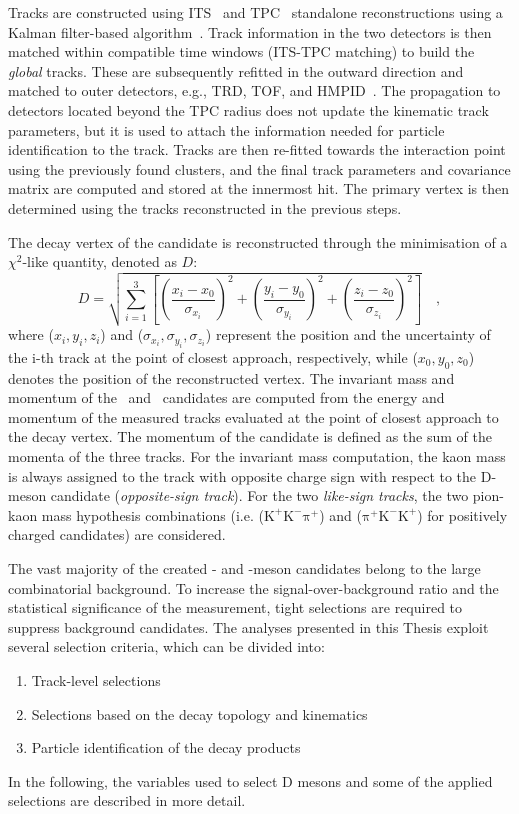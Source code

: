 Tracks are constructed using ITS~\cite{Concas:2878385} and TPC~\cite{Rohr:2018cxc} standalone reconstructions using a Kalman filter-based algorithm~\cite{Fruhwirth:1987fm}. Track information in the two detectors is then matched within compatible time windows (ITS-TPC matching) to build the \emph{global} tracks. These are subsequently refitted in the outward direction and matched to outer detectors, e.g., TRD, TOF, and HMPID~\cite{Rohr:2019ava}. The propagation to detectors located beyond the TPC radius does not update the kinematic track parameters, but it is used to attach the information needed for particle identification to the track. Tracks are then re-fitted towards the interaction point using the previously found clusters, and the final track parameters and covariance matrix are computed and stored at the innermost hit. The primary vertex is then determined using the tracks reconstructed in the previous steps.

The decay vertex of the candidate is reconstructed through the minimisation of a $\chi^2$-like quantity, denoted as $D$:
\begin{equation*}
    D = \sqrt{\sum_{i=1}^3 \left[\left(\frac{x_i-x_0}{\sigma_{x_i}}\right)^2 + \left(\frac{y_i-y_0}{\sigma_{y_i}}\right)^2 +\left(\frac{z_i-z_0}{\sigma_{z_i}}\right)^2\right]}\quad ,
\end{equation*}
where ($x_i,y_i,z_i$) and ($\sigma_{x_i},\sigma_{y_i},\sigma_{z_i}$) represent the position and the uncertainty of the i-th track at the point of closest approach, respectively, while ($x_0,y_0,z_0$) denotes the position of the reconstructed vertex. The invariant mass and momentum of the \ds\ and \dpl\ candidates are computed from the energy and momentum of the measured tracks evaluated at the point of closest approach to the decay vertex. The momentum of the candidate is defined as the sum of the momenta of the three tracks. For the invariant mass computation, the kaon mass is always assigned to the track with opposite charge sign with respect to the D-meson candidate (\emph{opposite-sign track}). For the two \emph{like-sign tracks}, the two pion-kaon mass hypothesis combinations \big(i.e. ($\mathrm{K^+K^-\pi^+}$) and ($\mathrm{\pi^+K^-K^+}$) for positively charged candidates\big) are considered. 

The vast majority of the created \ds- and \dpl-meson candidates belong to the large combinatorial background. To increase the signal-over-background ratio and the statistical significance of the measurement, tight selections are required to suppress background candidates. The analyses presented in this Thesis exploit several selection criteria, which can be divided into:
\begin{enumerate}[i]
    \item Track-level selections
    \item Selections based on the decay topology and kinematics
    \item Particle identification of the decay products
\end{enumerate}
In the following, the variables used to select D mesons and some of the applied selections are described in more detail.

